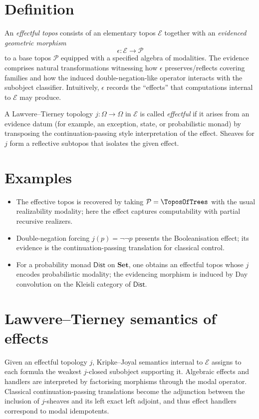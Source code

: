 \documentclass[12pt]{article}
\newcommand{\Set}{\mathbf{Set}}
\newcommand{\E}{\mathcal{E}}
\begin{document}
\section*{Definition}
An \emph{effectful topos} consists of an elementary topos $\E$ together with an \emph{evidenced geometric morphism}
\[
\epsilon\colon \E \longrightarrow \mathcal{P}
\]
to a base topos $\mathcal{P}$ equipped with a specified algebra of modalities.  The evidence comprises natural transformations witnessing how $\epsilon$ preserves/reflects covering families and how the induced double-negation-like operator interacts with the subobject classifier.  Intuitively, $\epsilon$ records the ``effects'' that computations internal to $\E$ may produce.

A Lawvere--Tierney topology $j\colon\Omega\to\Omega$ in $\E$ is called \emph{effectful} if it arises from an evidence datum (for example, an exception, state, or probabilistic monad) by transposing the continuation-passing style interpretation of the effect.  Sheaves for $j$ form a reflective subtopos that isolates the given effect.

\section*{Examples}
\begin{itemize}
  \item The effective topos is recovered by taking $\mathcal{P}=\ToposOfTrees$ with the usual realizability modality; here the effect captures computability with partial recursive realizers.
  \item Double-negation forcing $j(p)=\neg\neg p$ presents the Booleanisation effect; its evidence is the continuation-passing translation for classical control.
  \item For a probability monad $\mathsf{Dist}$ on $\Set$, one obtains an effectful topos whose $j$ encodes probabilistic modality; the evidencing morphism is induced by Day convolution on the Kleisli category of $\mathsf{Dist}$.
\end{itemize}

\section*{Lawvere--Tierney semantics of effects}
Given an effectful topology $j$, Kripke--Joyal semantics internal to $\E$ assigns to each formula the weakest $j$-closed subobject supporting it.  Algebraic effects and handlers are interpreted by factorising morphisms through the modal operator.  Classical continuation-passing translations become the adjunction between the inclusion of $j$-sheaves and its left exact left adjoint, and thus effect handlers correspond to modal idempotents.
\end{document}
